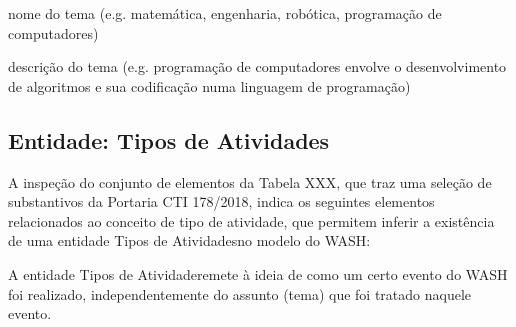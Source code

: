 \documentclass[
12pt,		%
openright,	%
twoside,  %
a4paper,			%
chapter=TITLE,		%
english,			%
french,				%
spanish,			%
brazil				%
]{USPSC-classe/USPSC}
\begin{document}
\begin{alineas}
\item nome do tema (e.g. matem\'atica, engenharia, rob\'otica, programa\c{c}\~ao de computadores)
\item descri\c{c}\~ao do tema (e.g. \textquotedbl programa\c{c}\~ao de computadores envolve o desenvolvimento de algoritmos e sua codifica\c{c}\~ao numa linguagem de programa\c{c}\~ao\textquotedbl )
\end{alineas}

\subsection[Entidade: Tipos de Atividades]{Entidade: Tipos de Atividades}\label{Entidade: Tipos de Atividades}
A inspe\c{c}\~ao do conjunto de elementos da Tabela XXX, que traz uma sele\c{c}\~ao de substantivos da Portaria CTI 178/2018, indica os seguintes elementos relacionados ao conceito de \textquotedbl tipo de atividade\textquotedbl , que permitem inferir a exist\^encia de uma entidade \textquotedbl Tipos de Atividades\textquotedbl  no modelo do WASH:















\noindent\begin{center}\mbox{\centering{}}\end{center}


A entidade \textquotedbl Tipos de Atividade\textquotedbl  remete \`a ideia de como um certo evento do WASH foi realizado, independentemente do assunto (tema) que foi tratado naquele evento.
\end{document}
